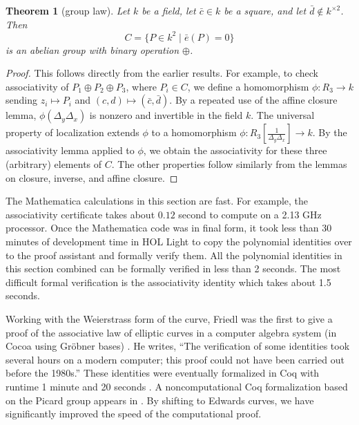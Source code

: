 \documentclass[12pt]{article}
\newtheorem{theorem}{Theorem}[subsection]
\newcommand{\f}[1]{\frac{1}{#1}}
\begin{document}
\begin{theorem}[group law]\label{thm:group} 
  Let $k$ be a field, let $\bar c \in k$ be a square, and let $\bar
  d\not\in k^{\times 2}$.  
  Then 
  \[
  C= \{P\in k^2 \mid \bar e(P) = 0\}
  \]
   is an abelian
  group with binary operation $\oplus$.
\end{theorem}

\begin{proof} This follows directly from the earlier results.  For
  example, to check associativity of $P_1\oplus P_2\oplus P_3$,
  where $P_i\in C$, we define a homomorphism
  $\phi:R_3\to k$ sending $z_i\mapsto P_i$ and
  $(c,d)\mapsto (\bar c,\bar d)$.  By a repeated use of the affine
  closure lemma, $\phi(\Delta_y\Delta_x)$ is nonzero and invertible in
  the field $k$.  The universal property of localization extends
  $\phi$ to a homomorphism $\phi:R_3[\f{\Delta_y\Delta_x}]\to k$.  By
  the associativity lemma applied to $\phi$, we obtain the
  associativity for these three (arbitrary) elements of $C$.  The
  other properties follow similarly from the lemmas on closure,
  inverse, and affine closure.
\end{proof}

The Mathematica calculations in this section are fast. For example,
the associativity certificate takes about $0.12$ second to compute on
a 2.13 GHz processor.  Once the Mathematica code was in final form, it
took less than 30 minutes of development time in HOL Light to copy the
polynomial identities over to the proof assistant and formally verify
them.  All the polynomial identities in this section combined can be
formally verified in less than 2 seconds. The most difficult formal
verification is the associativity identity which takes about 1.5
seconds.

Working with the Weierstrass form of the curve, Friedl was the first
to give a proof of the associative law of elliptic curves in a
computer algebra system (in Cocoa using Gr\"obner bases)
\cite{friedl}.  He writes, ``The verification of some identities took
several hours on a modern computer; this proof could not have been
carried out before the 1980s.''  These identities were eventually
formalized in Coq with runtime 1 minute and 20 seconds
\cite{thery2007proving}.  A noncomputational Coq
formalization based on the Picard group appears in
\cite{bartzia2014formal}.  By shifting to Edwards curves, we have
significantly improved the speed of the computational proof.
\end{document}
